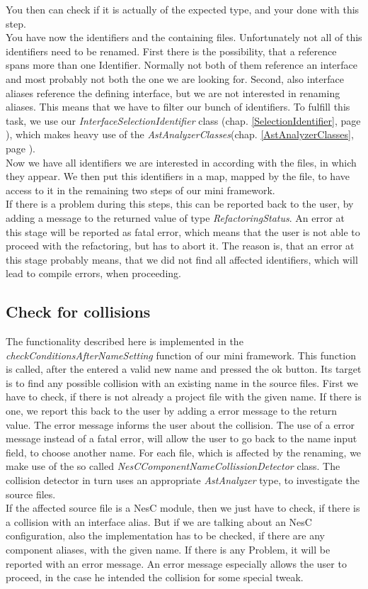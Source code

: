 \documentclass[a4paper,10pt]{report}
\begin{document}
You then can check if it is actually of the expected type, and your done with this step.\\
You have now the identifiers and the containing files. Unfortunately not all of this identifiers need to be renamed. First there is the possibility, that a reference 
spans more than one Identifier. Normally not both of them reference an interface and most probably not both the one we are looking for. 
Second, also interface aliases reference the defining interface, but we are not interested in renaming aliases. This means that we have to filter our bunch of identifiers.
To fulfill this task, we use our {\it InterfaceSelectionIdentifier} class (chap. \ref{SelectionIdentifier}, page \pageref{SelectionIdentifier}), which makes heavy use of the {\it AstAnalyzerClasses}(chap. \ref{AstAnalyzerClasses}, page \pageref{AstAnalyzerClasses}).\\
Now we have all identifiers we are interested in according with the files, in which they appear. 
We then put this identifiers in a map, mapped by the file, to have access to it in the remaining two steps of our mini framework.\\
If there is a problem during this steps, this can be reported back to the user, by adding a message to the returned value of type {\it RefactoringStatus}. 
An error at this stage will be reported as fatal error, which means that the user is not able to proceed with the refactoring, but has to abort it. 
The reason is, that an error at this stage probably means, that we did not find all affected identifiers, which will lead to compile errors, when proceeding.

\subsection{Check for collisions}
The functionality described here is implemented in the {\it checkConditionsAfterNameSetting} function of our mini framework.
This function is called, after the entered a valid new name and pressed the ok button. Its target is to find any possible collision with an existing name in the source files.
First we have to check, if there is not already a project file with the given name. If there is one, we report this back to the user by adding a error message to the return value.
The error message informs the user about the collision.
The use of a error message instead of a fatal error, will allow the user to go back to the name input field, to choose another name. 
For each file, which is affected by the renaming, we make use of the so called {\it NesCComponentNameCollissionDetector} class. 
The collision detector in turn uses an appropriate {\it AstAnalyzer} type, to investigate the source files.\\
If the affected source file is a NesC module, then we just have to check, if there is a collision with an interface alias. 
But if we are talking about an NesC configuration, also the implementation has to be checked, if there are any component aliases, with the given name.
If there is any Problem, it will be reported with an error message. An error message especially allows the user to proceed, in the case he intended the collision for some special tweak.
 
\end{document}

